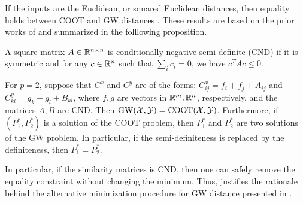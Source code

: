 If the inputs are the Euclidean, or squared Euclidean distances, then equality holds between
COOT and GW distances \citep{Sejourne20,Redko20}. These results are based on the prior works
of \citet{Konno76,Maron18} and summarized in the folllowing proposition.
\begin{definition}
  A square matrix $A \in \mathbb R^{n \times n}$ is conditionally negative semi-definite (CND)
  if it is symmetric and for any $c \in \mathbb R^n$ such that $\sum_i c_i = 0$, we have
  $c^T A c \leq 0$.
\end{definition}
\begin{proposition}
  \label{prop:coot_gw_equiv}
  For $p=2$, suppose that $C^x$ and $C^y$ are of the forms:
  $C^x_{ij} = f_i + f_j + A_{ij}$ and $C^y_{kl} = g_k + g_l + B_{kl}$,
  where $f, g$ are vectors in $\mathbb R^m, \mathbb R^n$, respectively,
  and the matrices $A, B$ are CND. Then $\text{GW}(\mathcal X, \mathcal Y) = \text{COOT}(\mathcal X, \mathcal Y)$.
  Furthermore, if $(P_1^*, P_2^*)$ is a solution of the COOT problem, then $P_1^*$ and $P_2^*$
  are two solutions of the GW problem. In particular,
  if the semi-definiteness is replaced by the definiteness, then $P_1^* = P_2^*$.
\end{proposition}
In particular, if the similarity matrices is CND,
then one can safely remove the equality constraint without changing the minimum.
Thus,  justifies the rationale behind
the alternative minimization procedure for GW distance presented in .

